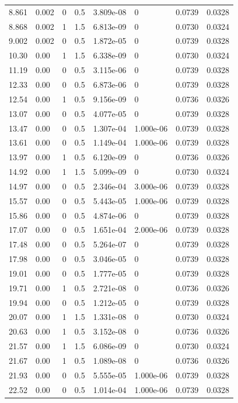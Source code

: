 \documentclass[preview]{standalone}
\begin{document}
{{\begin{tabular}{L{1.2cm}C{1.2cm} C{0.3cm}C{0.5cm} C{1.4cm}C{1.4cm} C{1.4cm}C{1.4cm}}
  8.861  &  0.002  & 0     & 0.5 &  3.809e-08  & 0  & 0.0739 &  0.0328   \\ 
  8.868  &  0.002  & 1     & 1.5 &  6.813e-09  & 0  & 0.0730 &  0.0324   \\ 
  9.002  &  0.002  & 0     & 0.5 &  1.872e-05  & 0  & 0.0739 &  0.0328   \\ 
  10.30  &  0.00  & 1     & 1.5 &  6.338e-09  & 0  & 0.0730 &  0.0324   \\ 
  11.19  &  0.00  & 0     & 0.5 &  3.115e-06  & 0  & 0.0739 &  0.0328   \\ 
  12.33  &  0.00  & 0     & 0.5 &  6.873e-06  & 0  & 0.0739 &  0.0328   \\ 
  12.54  &  0.00  & 1     & 0.5 &  9.156e-09  & 0  & 0.0736 &  0.0326   \\ 
  13.07  &  0.00  & 0     & 0.5 &  4.077e-05  & 0  & 0.0739 &  0.0328   \\ 
  13.47  &  0.00  & 0     & 0.5 &  1.307e-04  & 1.000e-06  & 0.0739 &  0.0328   \\ 
  13.61  &  0.00  & 0     & 0.5 &  1.149e-04  & 1.000e-06  & 0.0739 &  0.0328   \\ 
  13.97  &  0.00  & 1     & 0.5 &  6.120e-09  & 0  & 0.0736 &  0.0326   \\ 
  14.92  &  0.00  & 1     & 1.5 &  5.099e-09  & 0  & 0.0730 &  0.0324   \\ 
  14.97  &  0.00  & 0     & 0.5 &  2.346e-04  & 3.000e-06  & 0.0739 &  0.0328   \\ 
  15.57  &  0.00  & 0     & 0.5 &  5.443e-05  & 1.000e-06  & 0.0739 &  0.0328   \\ 
  15.86  &  0.00  & 0     & 0.5 &  4.874e-06  & 0  & 0.0739 &  0.0328   \\ 
  17.07  &  0.00  & 0     & 0.5 &  1.651e-04  & 2.000e-06  & 0.0739 &  0.0328   \\ 
  17.48  &  0.00  & 0     & 0.5 &  5.264e-07  & 0  & 0.0739 &  0.0328   \\ 
  17.98  &  0.00  & 0     & 0.5 &  3.046e-05  & 0  & 0.0739 &  0.0328   \\ 
  19.01  &  0.00  & 0     & 0.5 &  1.777e-05  & 0  & 0.0739 &  0.0328   \\ 
  19.71  &  0.00  & 1     & 0.5 &  2.721e-08  & 0  & 0.0736 &  0.0326   \\ 
  19.94  &  0.00  & 0     & 0.5 &  1.212e-05  & 0  & 0.0739 &  0.0328   \\ 
  20.07  &  0.00  & 1     & 1.5 &  1.331e-08  & 0  & 0.0730 &  0.0324   \\ 
  20.63  &  0.00  & 1     & 0.5 &  3.152e-08  & 0  & 0.0736 &  0.0326   \\ 
  21.57  &  0.00  & 1     & 1.5 &  6.086e-09  & 0  & 0.0730 &  0.0324   \\ 
  21.67  &  0.00  & 1     & 0.5 &  1.089e-08  & 0  & 0.0736 &  0.0326   \\ 
  21.93  &  0.00  & 0     & 0.5 &  5.555e-05  & 1.000e-06  & 0.0739 &  0.0328   \\ 
  22.52  &  0.00  & 0     & 0.5 &  1.014e-04  & 1.000e-06  & 0.0739 &  0.0328   \\ 
\hline 
\end{tabular} 

}}
\end{document}
